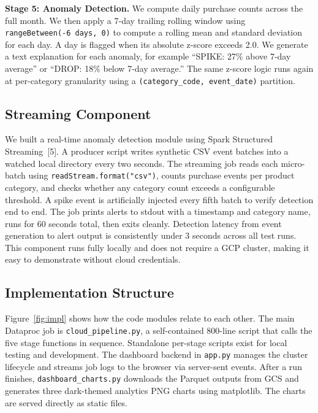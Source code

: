 \documentclass[letterpaper,twocolumn,10pt]{article}
\begin{document}
\textbf{Stage 5: Anomaly Detection.}
We compute daily purchase counts across the full month. We then apply a 7-day
trailing rolling window using \texttt{rangeBetween(-6 days, 0)} to compute a
rolling mean and standard deviation for each day. A day is flagged when its
absolute z-score exceeds 2.0. We generate a text explanation for each anomaly,
for example ``SPIKE: 27\% above 7-day average'' or ``DROP: 18\% below 7-day
average.'' The same z-score logic runs again at per-category granularity using
a \texttt{(category\_code, event\_date)} partition.

\subsection{Streaming Component}

We built a real-time anomaly detection module using Spark Structured
Streaming~[5]. A producer script writes synthetic CSV
event batches into a watched local directory every two seconds. The streaming job
reads each micro-batch using \texttt{readStream.format("csv")}, counts purchase
events per product category, and checks whether any category count exceeds a
configurable threshold. A spike event is artificially injected every fifth batch
to verify detection end to end. The job prints alerts to stdout with a timestamp
and category name, runs for 60 seconds total, then exits cleanly. Detection
latency from event generation to alert output is consistently under 3 seconds
across all test runs. This component runs fully locally and does not require a GCP
cluster, making it easy to demonstrate without cloud credentials.

\subsection{Implementation Structure}

Figure~\ref{fig:impl} shows how the code modules relate to each other. The main
Dataproc job is \texttt{cloud\_pipeline.py}, a self-contained 800-line script that
calls the five stage functions in sequence. Standalone per-stage scripts exist for
local testing and development. The dashboard backend in \texttt{app.py} manages
the cluster lifecycle and streams job logs to the browser via server-sent events.
After a run finishes, \texttt{dashboard\_charts.py} downloads the Parquet outputs
from GCS and generates three dark-themed analytics PNG charts using matplotlib.
The charts are served directly as static files.
\end{document}
